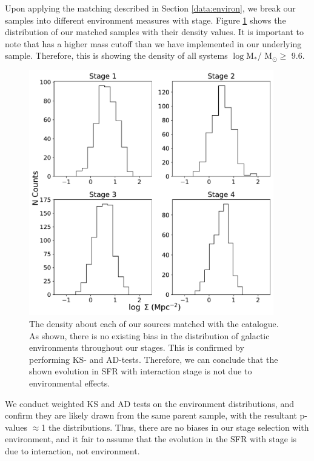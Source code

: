 Upon applying the matching described in Section \ref{data:environ}, we break our samples into different environment measures with stage. Figure \ref{fig:dens-stage} shows the distribution of our matched samples with their density values. It is important to note that \citet{2017ApJ...837...16D} has a higher mass cutoff than we have implemented in our underlying sample. Therefore, this is showing the density of all systems $\log$M$_*$/ M$_\odot \geq$ 9.6. 

\begin{figure}
    \centering
    \includegraphics[width=0.95\textwidth]{Chapter3/figures/density-stage.pdf}
    \caption{The density about each of our sources matched with the \citet{2017ApJ...837...16D} catalogue. As shown, there is no existing bias in the distribution of galactic environments throughout our stages. This is confirmed by performing KS- and AD-tests. Therefore, we can conclude that the shown evolution in SFR with interaction stage is not due to environmental effects.}
    \label{fig:dens-stage}
\end{figure}

We conduct weighted KS and AD tests on the environment distributions, and confirm they are likely drawn from the same parent sample, with the resultant p-values $\approx$1 the distributions. Thus, there are no biases in our stage selection with environment, and it fair to assume that the evolution in the SFR with stage is due to interaction, not environment.

